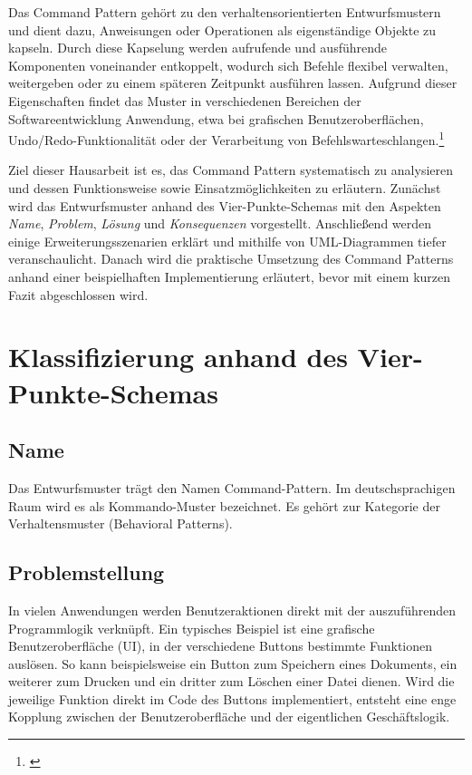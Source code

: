 \documentclass[12pt,a4paper]{article}
\begin{document}
    Das Command Pattern gehört zu den verhaltensorientierten Entwurfsmustern und dient dazu, Anweisungen oder
    Operationen als eigenständige Objekte zu kapseln. Durch diese Kapselung werden aufrufende und ausführende
    Komponenten voneinander entkoppelt, wodurch sich Befehle flexibel verwalten, weitergeben oder zu einem späteren
    Zeitpunkt ausführen lassen. Aufgrund dieser Eigenschaften findet das Muster in verschiedenen Bereichen der
    Softwareentwicklung Anwendung, etwa bei grafischen Benutzeroberflächen, Undo/Redo-Funktionalität oder der
    Verarbeitung von Befehlswarteschlangen.\footnote{\cite{schiele-command}}

    Ziel dieser Hausarbeit ist es, das Command Pattern systematisch zu analysieren und dessen Funktionsweise sowie
    Einsatzmöglichkeiten zu erläutern. Zunächst wird das Entwurfsmuster anhand des Vier-Punkte-Schemas mit den
    Aspekten \textit{Name}, \textit{Problem}, \textit{Lösung} und \textit{Konsequenzen} vorgestellt. Anschließend
    werden einige Erweiterungsszenarien erklärt und mithilfe von UML-Diagrammen tiefer veranschaulicht. Danach wird die
    praktische Umsetzung des Command Patterns anhand einer beispielhaften Implementierung erläutert, bevor mit einem
    kurzen Fazit abgeschlossen wird.





    \section{Klassifizierung anhand des Vier-Punkte-Schemas}

    \subsection{Name}
    Das Entwurfsmuster trägt den Namen Command-Pattern. Im deutschsprachigen Raum wird es als Kommando-Muster bezeichnet.
    Es gehört zur Kategorie der Verhaltensmuster (Behavioral Patterns).

    \subsection{Problemstellung}
    In vielen Anwendungen werden Benutzeraktionen direkt mit der auszuführenden Programmlogik verknüpft.
    Ein typisches Beispiel ist eine grafische Benutzeroberfläche (UI), in der verschiedene Buttons bestimmte Funktionen
    auslösen. So kann beispielsweise ein Button zum Speichern eines Dokuments, ein weiterer zum Drucken und ein dritter
    zum Löschen einer Datei dienen. Wird die jeweilige Funktion direkt im Code des Buttons implementiert, entsteht eine
    enge Kopplung zwischen der Benutzeroberfläche und der eigentlichen Geschäftslogik.
\end{document}
